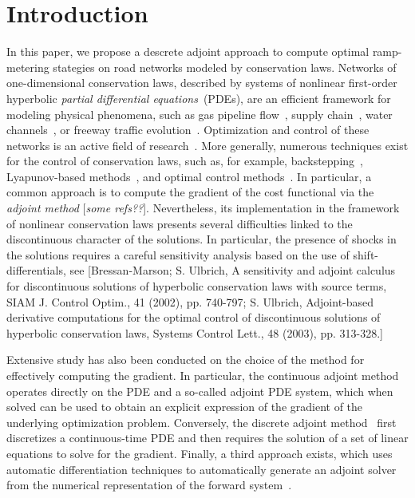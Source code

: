 \section{Introduction} %
\label{sec:introduction}

In  this paper, we propose a descrete adjoint approach to compute optimal ramp-metering stategies on road networks modeled by conservation laws.
Networks of one-dimensional conservation laws,
described by systems of nonlinear first-order hyperbolic \textit{partial
differential equations}~(PDEs), are an efficient framework for modeling
physical phenomena,  such as gas pipeline flow~\cite{Rothfarb1970}, supply
chain~\cite{Brunnermeier1999}, water channels~\cite{Rabbani2010,litrico2009boundary}, or freeway
traffic evolution~\cite{garavello2006traffic,work2010traffic,frazzoli2002real}. Optimization
and  control of these networks is an active field of
research~\cite{Gugat2005,Bayen2006,Kotsialos2004}. More generally, numerous
techniques exist for the control of conservation laws, such as, for example,
backstepping~\cite{Coron2013,Glass2007}, Lyapunov-based methods~\cite{Coron2013}, and
optimal control methods~\cite{Jacquet2006,Blanchard2013,Keller2013}.
In particular, a common  approach is to compute the gradient of the cost functional via the \textit{adjoint method} [{\it some refs??}].
Nevertheless, its implementation in the framework of nonlinear conservation laws presents several difficulties linked to the discontinuous  character of the solutions. In particular, the presence of shocks in the solutions requires a careful sensitivity analysis based on the use of shift-differentials, see [Bressan-Marson;  S. Ulbrich, A sensitivity and adjoint calculus for discontinuous solutions of hyperbolic
conservation laws with source terms, SIAM J. Control Optim., 41 (2002), pp. 740-797; S. Ulbrich, Adjoint-based derivative computations for the optimal control of discontinuous
solutions of hyperbolic conservation laws, Systems Control Lett., 48 (2003), pp. 313-328.]

Extensive study has also been conducted on the choice of the method for effectively computing the gradient. In particular, the continuous adjoint
method~\cite{Jacquet2005,Gugat2005,Moin1994,Reuther1996} operates directly on
the PDE and a so-called adjoint PDE system, which when solved can be used to
obtain an explicit  expression of the gradient of the underlying optimization
problem. Conversely,  the discrete adjoint
method~\cite{Giles2000,Gugat2005,Kotsialos2004} first discretizes a
continuous-time PDE and then requires the solution of a set of linear
equations  to solve for the gradient. Finally, a third approach exists, which
uses  automatic differentiation techniques to automatically generate an
adjoint  solver from the numerical representation of the forward
system~\cite{Muller2005,Giering1998}.

